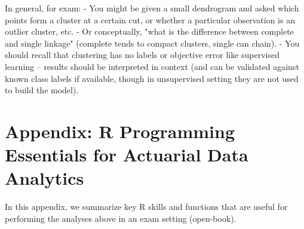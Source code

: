 \documentclass[11pt]{article}
\begin{document}
In general, for exam:
- You might be given a small dendrogram and asked which points form a cluster at a certain cut, or whether a particular observation is an outlier cluster, etc.
- Or conceptually, "what is the difference between complete and single linkage" (complete tends to compact clusters, single can chain).
- You should recall that clustering has no labels or objective error like supervised learning – results should be interpreted in context (and can be validated against known class labels if available, though in unsupervised setting they are not used to build the model).

\appendix
\section{Appendix: R Programming Essentials for Actuarial Data Analytics}
In this appendix, we summarize key R skills and functions that are useful for performing the analyses above in an exam setting (open-book).
\end{document}
